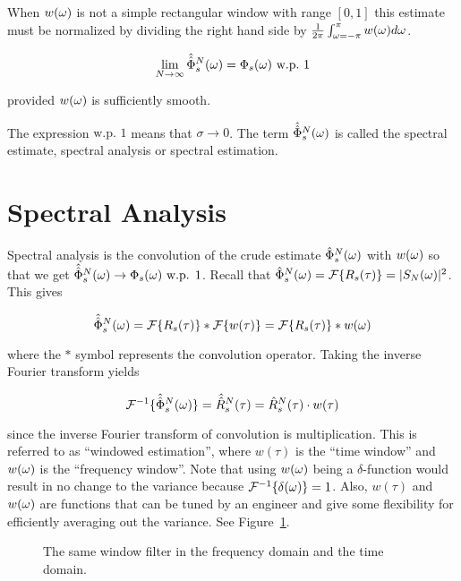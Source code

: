 When $w(\omega)$ is not a simple rectangular window with range $[0,1]$ this estimate must be normalized by dividing the right hand side by $\frac{1}{2\pi}\int_{\omega=-\pi}^\pi w(\omega)d\omega$.

\begin{theorem}

\begin{equation*}
\lim_{N\to\infty}\hat{\hat{\Phi}}_s^N(\omega) = \Phi_s(\omega) \text{~w.p.~} 1
\end{equation*}

provided $w(\omega)$ is sufficiently smooth.
\end{theorem}
The expression $\text{w.p. } 1$ means that $\sigma\to 0$.
The term $\hat{\hat{\Phi}}_s^N(\omega)$ is called the spectral estimate, spectral analysis or spectral estimation.

\section{Spectral Analysis}
Spectral analysis is the convolution of the crude estimate $\hat{\Phi}_s^N(\omega)$ with $w(\omega)$ so that we get $\hat{\hat{\Phi}}_s^N(\omega) \to \Phi_s(\omega) \text{ w.p. } 1$.
Recall that $\hat{\Phi}_s^N(\omega) = \mathcal{F}\{R_s(\tau)\} = |S_N(\omega)|^2$.
This gives

\begin{equation*}
\hat{\hat{\Phi}}_s^N(\omega) = \mathcal{F}\{R_s(\tau)\} * \mathcal{F}\{w(\tau)\} = \mathcal{F}\{R_s(\tau)\} * w(\omega)
\end{equation*}

where the $*$ symbol represents the convolution operator.
Taking the inverse Fourier transform yields

\begin{equation*}
\mathcal{F}^{-1}\{\hat{\hat{\Phi}}_s^N(\omega)\} = \hat{\hat{R}}_s^N(\tau) = \hat{R}_s^N(\tau)\cdot w(\tau)
\end{equation*}

since the inverse Fourier transform of convolution is multiplication.
This is referred to as ``windowed estimation'', where $w(\tau)$ is the ``time window'' and $w(\omega)$ is the ``frequency window''.
Note that using $w(\omega)$ being a $\delta$-function would result in no change to the variance because $\mathcal{F}^{-1}\{\delta(\omega)\} = 1$.
Also, $w(\tau)$ and $w(\omega)$ are functions that can be tuned by an engineer and give some flexibility for efficiently averaging out the variance.
See Figure~\ref{fig:06windowfilter}.

\begin{figure}[ht!]
\centering
{}
\hfill
{}
\hfill
\caption{The same window filter in the \protect{} frequency domain and the \protect{} time domain.}%
\label{fig:06windowfilter}
\end{figure}

